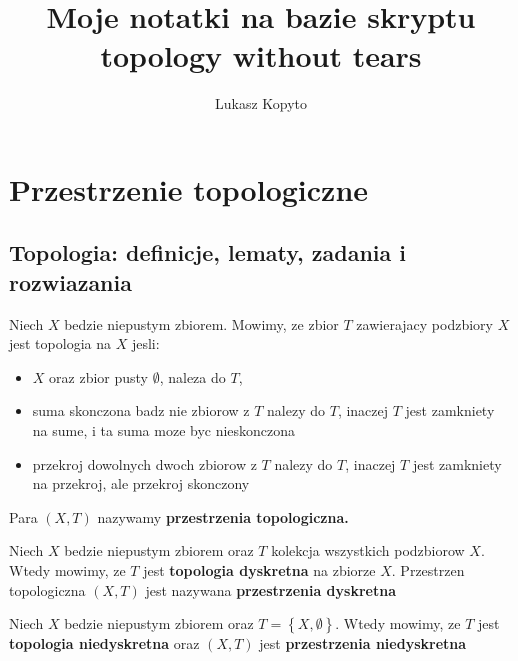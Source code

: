 \documentclass{article}
\author{Lukasz Kopyto}
\title{Moje notatki na bazie skryptu topology without tears}
\begin{document}
\maketitle     %

\section{Przestrzenie topologiczne}
\subsection{Topologia: definicje, lematy, zadania i rozwiazania}
\begin{tcolorbox}[colback=white!90!red,colframe=black!35!red,title=1.1.1 Definicja: Topologia]

    Niech $X$ bedzie niepustym zbiorem. Mowimy, ze zbior $T$ zawierajacy podzbiory $X$ jest topologia na $X$ jesli:
    \begin{itemize}
        \item $X$ oraz zbior pusty $\emptyset$, naleza do $T$,
        \item suma skonczona badz nie zbiorow z $T$ nalezy do $T$,
            inaczej $T$ jest zamkniety na sume, i ta suma moze byc nieskonczona
        \item przekroj dowolnych dwoch zbiorow z $T$ nalezy do $T$, inaczej $T$ jest zamkniety na przekroj, ale przekroj skonczony
    \end{itemize}

    Para $(X,T)$ nazywamy \textbf{przestrzenia topologiczna.}
\end{tcolorbox}

\begin{tcolorbox}[colback=white!90!red,colframe=black!35!red,title=1.1.6 Definicja: Topologia dyskretna(discrete topology)]

    Niech $X$ bedzie niepustym zbiorem oraz $T$ kolekcja wszystkich podzbiorow $X$. Wtedy mowimy, ze $T$ jest \textbf{topologia dyskretna} na zbiorze $X$. Przestrzen topologiczna $(X,T)$ jest nazywana \textbf{przestrzenia dyskretna}
\end{tcolorbox}

\begin{tcolorbox}[colback=white!90!red,colframe=black!35!red,title=1.1.7 Definicja: Topologia niedyskretne(indiscrete topology)]

    Niech $X$ bedzie niepustym zbiorem oraz $T= \left\{X, \emptyset\right\}$. Wtedy mowimy, ze $T$ jest \textbf{topologia niedyskretna} oraz $(X,T)$ jest \textbf{przestrzenia niedyskretna} 

\end{tcolorbox}
\end{document}
